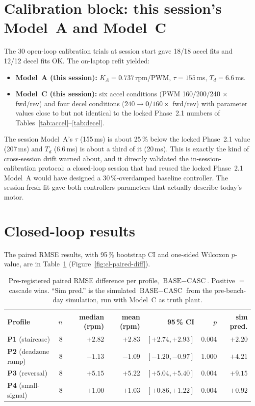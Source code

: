 \section{Calibration block: this session's Model~A and Model~C}
\label{sec:cl-calib}

The 30 open-loop calibration trials at session start gave 18/18 accel fits and 12/12 decel fits OK. The on-laptop refit yielded:
\begin{itemize}
  \item \textbf{Model~A (this session):} $K_A = 0.737$\,rpm/PWM, $\tau = 155$\,ms, $T_d = 6.6$\,ms.
  \item \textbf{Model~C (this session):} six accel conditions (PWM 160/200/240 $\times$ fwd/rev) and four decel conditions ($240 \to 0/160 \times$ fwd/rev) with parameter values close to but not identical to the locked Phase~2.1 numbers of Tables~\ref{tab:accel}--\ref{tab:decel}.
\end{itemize}
The session Model~A's $\tau$ (155\,ms) is about 25\,\% below the locked Phase~2.1 value (207\,ms) and $T_d$ (6.6\,ms) is about a third of it (20\,ms). This is exactly the kind of cross-session drift  warned about, and it directly validated the in-session-calibration protocol: a closed-loop session that had reused the locked Phase~2.1 Model~A would have designed a 30\,\%-overdamped baseline controller. The session-fresh fit gave both controllers parameters that actually describe today's motor.

\section{Closed-loop results}
\label{sec:cl-results}

The paired RMSE results, with 95\,\% bootstrap CI and one-sided Wilcoxon $p$-value, are in Table~\ref{tab:cl-paired} (Figure~\ref{fig:cl-paired-diff}).

\begin{table}[h]
\centering
\begin{tabular}{lrrrrrr}
\toprule
Profile & $n$ & median (rpm) & mean (rpm) & 95\,\% CI & $p$ & sim pred. \\
\midrule
\textbf{P1} (staircase)        & 8 & $+2.82$ & $+2.83$ & $[+2.74, +2.93]$ & $0.004$ & $+2.20$ \\
\textbf{P2} (deadzone ramp)    & 8 & $-1.13$ & $-1.09$ & $[-1.20, -0.97]$ & $1.000$ & $+4.21$ \\
\textbf{P3} (reversal)         & 8 & $+5.15$ & $+5.22$ & $[+5.04, +5.40]$ & $0.004$ & $+9.15$ \\
\textbf{P4} (small-signal)     & 8 & $+1.00$ & $+1.03$ & $[+0.86, +1.22]$ & $0.004$ & $+0.92$ \\
\bottomrule
\end{tabular}
\caption{Pre-registered paired RMSE difference per profile, $\text{BASE} - \text{CASC}$. Positive $=$ cascade wins. ``Sim pred.'' is the simulated $\text{BASE} - \text{CASC}$ from the pre-bench-day simulation, run with Model~C as truth plant.}
\label{tab:cl-paired}
\end{table}

